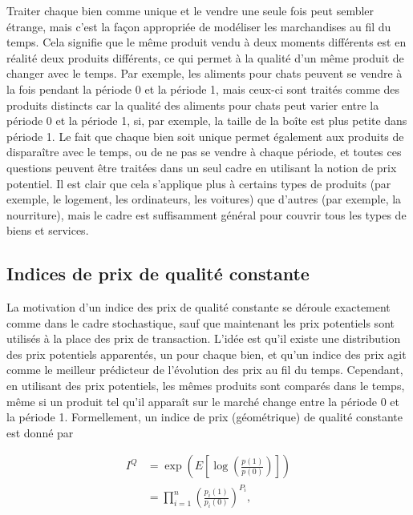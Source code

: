\documentclass[]{article}
\begin{document}
Traiter chaque bien comme unique et le vendre une seule fois peut sembler étrange, mais c'est la façon appropriée de modéliser les marchandises au fil du temps. Cela signifie que le même produit vendu à deux moments différents est en réalité deux produits différents, ce qui permet à la qualité d'un même produit de changer avec le temps. Par exemple, les aliments pour chats peuvent se vendre à la fois pendant la période 0 et la période 1, mais ceux-ci sont traités comme des produits distincts car la qualité des aliments pour chats peut varier entre la période 0 et la période 1, si, par exemple, la taille de la boîte est plus petite dans période 1. Le fait que chaque bien soit unique permet également aux produits de disparaître avec le temps, ou de ne pas se vendre à chaque période, et toutes ces questions peuvent être traitées dans un seul cadre en utilisant la notion de prix potentiel. Il est clair que cela s'applique plus à certains types de produits (par exemple, le logement, les ordinateurs, les voitures) que d'autres (par exemple, la nourriture), mais le cadre est suffisamment général pour couvrir tous les types de biens et services.

\hypertarget{indices-de-prix-de-qualituxe9-constante}{%
\subsection{Indices de prix de qualité constante}\label{indices-de-prix-de-qualituxe9-constante}}

La motivation d'un indice des prix de qualité constante se déroule exactement comme dans le cadre stochastique, sauf que maintenant les prix potentiels sont utilisés à la place des prix de transaction. L'idée est qu'il existe une distribution des prix potentiels apparentés, un pour chaque bien, et qu'un indice des prix agit comme le meilleur prédicteur de l'évolution des prix au fil du temps. Cependant, en utilisant des prix potentiels, les mêmes produits sont comparés dans le temps, même si un produit tel qu'il apparaît sur le marché change entre la période 0 et la période 1. Formellement, un indice de prix (géométrique) de qualité constante est donné par

\begin{align*}
I^{Q} &= \exp\left(E \left[\log \left(\frac{p(1)}{p(0)} \right) \right] \right) \\
&= \prod_{i = 1}^{n} \left(\frac{p_{i}(1)}{p_{i}(0)} \right)^{P_{i}},
\end{align*}
\end{document}
